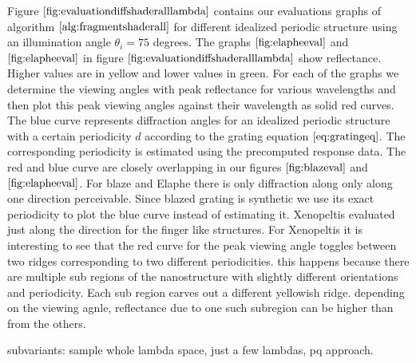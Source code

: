 Figure $\ref{fig:evaluationdiffshaderalllambda}$ contains our evaluations graphs of algorithm $\ref{alg:fragmentshaderall}$ for different idealized periodic structure using an illumination angle $\theta_i = 75$ degrees. The graphs $\ref{fig:elapheeval}$ and $\ref{fig:elapheeval}$ in figure $\ref{fig:evaluationdiffshaderalllambda}$ show reflectance. Higher values are in yellow and lower values in green. For each of the graphs we determine the viewing angles with peak reflectance for various wavelengths and then plot this peak viewing angles against their wavelength as solid red curves. The blue curve represents diffraction angles for an idealized periodic structure with a certain periodicity $d$ according to the grating equation $\ref{eq:gratingeq}$. The corresponding periodicity is estimated using the precomputed response data. The red and blue curve are closely overlapping in our figures $\ref{fig:blazeval}$ and $\ref{fig:elapheeval}$. For blaze and Elaphe there is only diffraction along only along one direction perceivable. Since blazed grating is synthetic we use its exact periodicity to plot the blue curve instead of estimating it. Xenopeltis evaluated just along the direction for the finger like structures. For Xenopeltis it is interesting to see that the red curve for the peak viewing angle toggles between two ridges corresponding to two different periodicities. this happens because there are multiple sub regions of the nanostructure with slightly different orientations and periodicity. Each sub region carves out a different yellowish ridge. depending on the viewing agnle, reflectance due to one such subregion can be higher than from the others.


subvariants: sample whole lambda space, just a few lambdas, pq approach.

